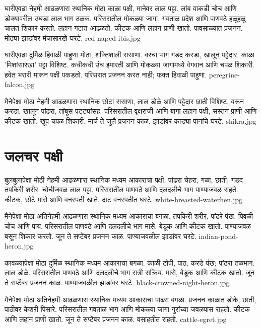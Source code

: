 \documentclass[aspectratio=169]{beamer}
\begin{document}
{घारीएवढा}
{नेहमी आढळणारा स्थानिक}
{मोठा काळा पक्षी, मानेवर लाल पट्टा. लांब वाकडी चोच आणि डोक्यावरील उघडा लाल भाग ठळक.}
{परिसरातील मोकळ्या जागा, गवताळ प्रदेश आणि पाणवठे}
{हळूहळू चालत शिकार करतो. लहान गटात आढळतो. कीटक आणि लहान प्राणी खातो.}
{पावसाळ्यात प्रजनन. मोठ्या झाडांवर मंचासारखे घरटे.}
{red-naped-ibis.jpg}

{घारीएवढा}
{दुर्मिळ हिवाळी पाहुणा}
{मोठा, शक्तिशाली ससाणा. वरचा भाग गडद करडा, खालून पट्टेदार. काळा 'मिशांसारखा' पट्टा विशिष्ट.}
{कधीकधी उंच इमारती आणि मोकळ्या जागांमध्ये}
{वेगवान आणि चपळ शिकारी. हवेत भरारी मारून पक्षी पकडतो.}
{परिसरात प्रजनन करत नाही; फक्त हिवाळी पाहुणा.}
{peregrine-falcon.jpg}

{मैनेपेक्षा मोठा}
{नेहमी आढळणारा स्थानिक}
{छोटा ससाणा, लाल डोळे आणि पट्टेदार छाती विशिष्ट. वरून करडा, खालून पांढरा, तांबूस पट्ट्यांसह.}
{परिसरातील वृक्षराजी आणि बागा}
{लहान पक्षी, सस्तन प्राणी आणि कीटक खातो. खूप चपळ शिकारी.}
{मार्च ते जुलै प्रजनन काळ. झाडांवर काड्या-पानांचे घरटे.}
{shikra.jpg}

\section{जलचर पक्षी}
{बुलबुलापेक्षा मोठी}
{नेहमी आढळणारा स्थानिक}
{मध्यम आकाराचा पक्षी. पांढरा चेहरा, गळा, छाती; गडद तपकिरी शरीर. चोचीजवळ लाल पट्टा.}
{परिसरातील पाणवठे आणि दलदलीचे भाग}
{पाण्याजवळ राहते. कीटक, छोटे मासे आणि वनस्पती खाते.}
{दाट वनस्पतीत घरटे.}
{white-breasted-waterhen.jpg}

{मैनेपेक्षा मोठा}
{अतिनेहमी आढळणारा स्थानिक}
{मध्यम आकाराचा बगळा. तपकिरी शरीर, पांढरे पंख. पिवळी चोच आणि पाय.}
{परिसरातील पाणवठे आणि दलदलीचे भाग}
{मासे, बेडूक आणि कीटक खातो. पाण्याजवळ बसून शिकार करतो.}
{जून ते सप्टेंबर प्रजनन काळ. पाण्याजवळील झाडांवर घरटे.}
{indian-pond-heron.jpg}

{कावळ्यापेक्षा मोठा}
{दुर्मिळ स्थानिक}
{मध्यम आकाराचा बगळा. काळी टोपी, पाठ; करडे पंख; पांढरा तळभाग. लाल डोळे.}
{परिसरातील पाणवठे आणि दलदलीचे भाग}
{रात्री सक्रिय. मासे, बेडूक आणि कीटक खातो.}
{जून ते सप्टेंबर प्रजनन काळ. पाण्याजवळील झाडांवर घरटे.}
{black-crowned-night-heron.jpg}

{मैनेपेक्षा मोठा}
{अतिनेहमी आढळणारा स्थानिक}
{मध्यम आकाराचा पांढरा बगळा. प्रजनन काळात डोके, छाती, पाठीवर केशरी पिसारे.}
{परिसरातील गवताळ भाग आणि मोकळ्या जागा}
{गुरांच्या जवळपास राहतो. कीटक आणि लहान प्राणी खातो.}
{जून ते सप्टेंबर प्रजनन काळ. वसाहतीत राहतो.}
{cattle-egret.jpg}
\end{document}
